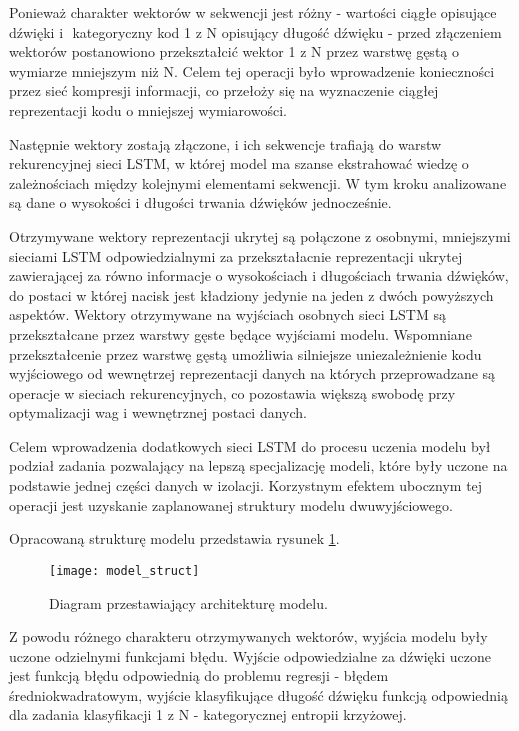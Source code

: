 {{        Ponieważ charakter wektorów w\,\,sekwencji jest różny - wartości ciągłe opisujące dźwięki i\,\,
        kategoryczny kod 1 z\,\,N opisujący długość dźwięku - przed złączeniem wektorów postanowiono 
        przekształcić wektor 1 z\,\,N przez warstwę gęstą o\,\,wymiarze mniejszym niż\,\,N. Celem tej operacji
        było wprowadzenie konieczności przez sieć kompresji informacji, co przełoży się 
        na wyznaczenie ciągłej reprezentacji kodu o\,\,mniejszej wymiarowości. 

        Następnie wektory zostają złączone, i\,\,ich sekwencje trafiają do warstw rekurencyjnej sieci LSTM, w\,\,której model ma szanse ekstrahować wiedzę o\,\,zależnościach między kolejnymi elementami sekwencji. W tym kroku analizowane są dane o wysokości i długości trwania dźwięków jednocześnie.

        Otrzymywane wektory reprezentacji ukrytej są połączone z\,\,osobnymi, 
        mniejszymi sieciami LSTM odpowiedzialnymi za przekształacnie reprezentacji 
        ukrytej zawierającej za równo informacje o wysokościach i długościach trwania dźwięków, 
        do postaci w której nacisk jest kładziony jedynie na jeden z dwóch powyższych aspektów. 
        Wektory otrzymywane na wyjściach osobnych sieci LSTM są przekształcane przez warstwy gęste będące wyjściami modelu. 
        Wspomniane przekształcenie przez warstwę gęstą umożliwia silniejsze uniezależnienie kodu 
        wyjściowego od wewnętrzej reprezentacji danych na których przeprowadzane są operacje 
        w sieciach rekurencyjnych, co pozostawia większą swobodę przy optymalizacji wag i wewnętrznej postaci danych.
        
        Celem wprowadzenia dodatkowych sieci LSTM do procesu uczenia modelu był podział zadania pozwalający na lepszą specjalizację modeli, które były uczone na podstawie jednej części danych w izolacji. Korzystnym efektem ubocznym tej operacji jest uzyskanie zaplanowanej struktury modelu dwuwyjściowego.

        Opracowaną strukturę modelu przedstawia rysunek \ref{model_struct}.
        
        \begin{figure}[H]
            \centering
            \texttt{[image: model\_struct]}
            \caption{Diagram przestawiający architekturę modelu.}
            \label{model_struct}
        \end{figure}

        Z powodu różnego charakteru otrzymywanych wektorów, wyjścia modelu były uczone odzielnymi funkcjami błędu. 
        Wyjście odpowiedzialne za dźwięki uczone jest funkcją błędu odpowiednią do problemu 
        regresji - błędem średniokwadratowym, wyjście klasyfikujące długość dźwięku funkcją odpowiednią
        dla zadania klasyfikacji 1 z\,\,N - kategorycznej entropii krzyżowej.
    }

}
